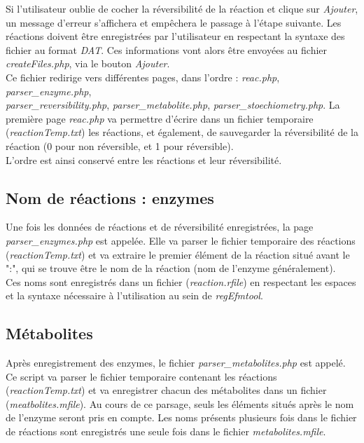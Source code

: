 Si l'utilisateur oublie de cocher la réversibilité de la réaction et clique sur \emph{Ajouter}, un message d'erreur s'affichera et empêchera le passage à l'étape suivante. Les réactions doivent être enregistrées par l'utilisateur en respectant la syntaxe des fichier au format \emph{DAT}. Ces informations vont alors être envoyées au fichier \emph{createFiles.php}, via le bouton \emph{Ajouter}.\\
Ce fichier redirige vers différentes pages, dans l'ordre : \emph{reac.php}, \emph{parser\_enzyme.php},
\\ \emph{parser\_reversibility.php}, \emph{parser\_metabolite.php}, \emph{parser\_stoechiometry.php}.
La première page \emph{reac.php} va permettre d'écrire dans un fichier temporaire (\emph{reactionTemp.txt}) les réactions, et également, de sauvegarder la réversibilité de la réaction (0 pour non réversible, et 1 pour réversible).\\
L'ordre est ainsi conservé entre les réactions et leur réversibilité.

\subsection{Nom de réactions : enzymes}
Une fois les données de réactions et de réversibilité enregistrées, la page \emph{parser\_enzymes.php} est appelée. Elle va parser le fichier temporaire des réactions (\emph{reactionTemp.txt}) et va extraire le premier élément de la réaction situé avant le ":", qui se trouve être le nom de la réaction (nom de l'enzyme généralement).\\
Ces noms sont enregistrés dans un fichier (\emph{reaction.rfile}) en respectant les espaces et la syntaxe nécessaire à l'utilisation au sein de \emph{regEfmtool}.

\subsection{Métabolites}
Après enregistrement des enzymes, le fichier \emph{parser\_metabolites.php} est appelé. Ce script va parser le fichier temporaire contenant les réactions (\emph{reactionTemp.txt}) et va enregistrer chacun des métabolites dans un fichier (\emph{meatbolites.mfile}). Au cours de ce parsage, seuls les éléments situés après le nom de l'enzyme seront pris en compte. Les noms présents plusieurs fois dans le fichier de réactions sont enregistrés une seule fois dans le fichier \emph{metabolites.mfile}.

